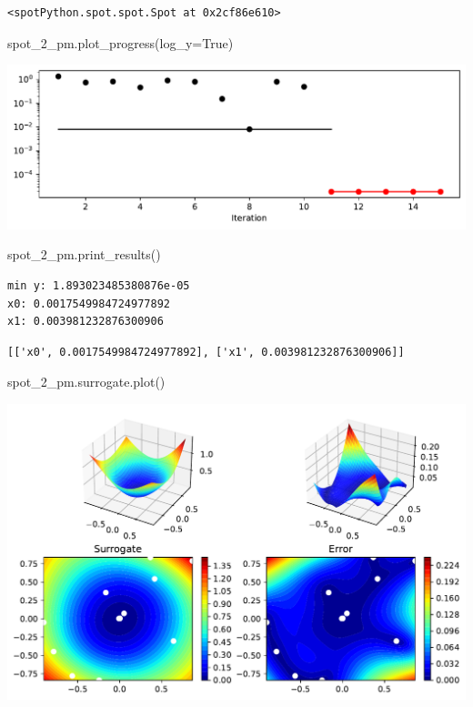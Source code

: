 \documentclass[
  letterpaper,
  DIV=11,
  numbers=noendperiod]{scrreprt}
\newenvironment{Shaded}{\begin{snugshade}}{\end{snugshade}}
\newcommand{\NormalTok}[1]{\textcolor[rgb]{0.00,0.23,0.31}{#1}}
\newcommand{\OperatorTok}[1]{\textcolor[rgb]{0.37,0.37,0.37}{#1}}
\newcommand{\VariableTok}[1]{\textcolor[rgb]{0.07,0.07,0.07}{#1}}
\begin{document}
\begin{verbatim}
<spotPython.spot.spot.Spot at 0x2cf86e610>
\end{verbatim}

\begin{Shaded}
\begin{Highlighting}[]
\NormalTok{spot\_2\_pm.plot\_progress(log\_y}\OperatorTok{=}\VariableTok{True}\NormalTok{)}
\end{Highlighting}
\end{Shaded}

\includegraphics{015_num_spot_correlation_p_files/figure-pdf/cell-16-output-1.pdf}

\begin{Shaded}
\begin{Highlighting}[]
\NormalTok{spot\_2\_pm.print\_results()}
\end{Highlighting}
\end{Shaded}

\begin{verbatim}
min y: 1.893023485380876e-05
x0: 0.0017549984724977892
x1: 0.003981232876300906
\end{verbatim}

\begin{verbatim}
[['x0', 0.0017549984724977892], ['x1', 0.003981232876300906]]
\end{verbatim}

\begin{Shaded}
\begin{Highlighting}[]
\NormalTok{spot\_2\_pm.surrogate.plot()}
\end{Highlighting}
\end{Shaded}

\includegraphics{015_num_spot_correlation_p_files/figure-pdf/cell-18-output-1.pdf}
\end{document}
